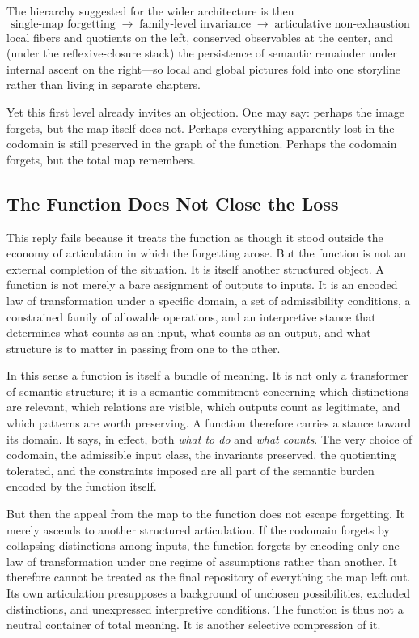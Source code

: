 \documentclass[11pt,a4paper]{article}
\theoremstyle{plain}
\theoremstyle{definition}
\theoremstyle{remark}
\begin{document}
The hierarchy suggested for the wider architecture is then
\[
  \text{single-map forgetting}
  \;\to\;
  \text{family-level invariance}
  \;\to\;
  \text{articulative non-exhaustion}
\]
local fibers and quotients on the left, conserved observables at the center, and (under the reflexive-closure stack) the persistence of semantic remainder under internal ascent on the right---so local and global pictures fold into one storyline rather than living in separate chapters.

Yet this first level already invites an objection. One may say: perhaps the image forgets, but the map itself does not. Perhaps everything apparently lost in the codomain is still preserved in the graph of the function. Perhaps the codomain forgets, but the total map remembers.

\subsection{The Function Does Not Close the Loss}

This reply fails because it treats the function as though it stood outside the economy of articulation in which the forgetting arose. But the function is not an external completion of the situation. It is itself another structured object. A function is not merely a bare assignment of outputs to inputs. It is an encoded law of transformation under a specific domain, a set of admissibility conditions, a constrained family of allowable operations, and an interpretive stance that determines what counts as an input, what counts as an output, and what structure is to matter in passing from one to the other.

In this sense a function is itself a bundle of meaning. It is not only a transformer of semantic structure; it is a semantic commitment concerning which distinctions are relevant, which relations are visible, which outputs count as legitimate, and which patterns are worth preserving. A function therefore carries a stance toward its domain. It says, in effect, both \emph{what to do} and \emph{what counts}. The very choice of codomain, the admissible input class, the invariants preserved, the quotienting tolerated, and the constraints imposed are all part of the semantic burden encoded by the function itself.

But then the appeal from the map to the function does not escape forgetting. It merely ascends to another structured articulation. If the codomain forgets by collapsing distinctions among inputs, the function forgets by encoding only one law of transformation under one regime of assumptions rather than another. It therefore cannot be treated as the final repository of everything the map left out. Its own articulation presupposes a background of unchosen possibilities, excluded distinctions, and unexpressed interpretive conditions. The function is thus not a neutral container of total meaning. It is another selective compression of it.
\end{document}
